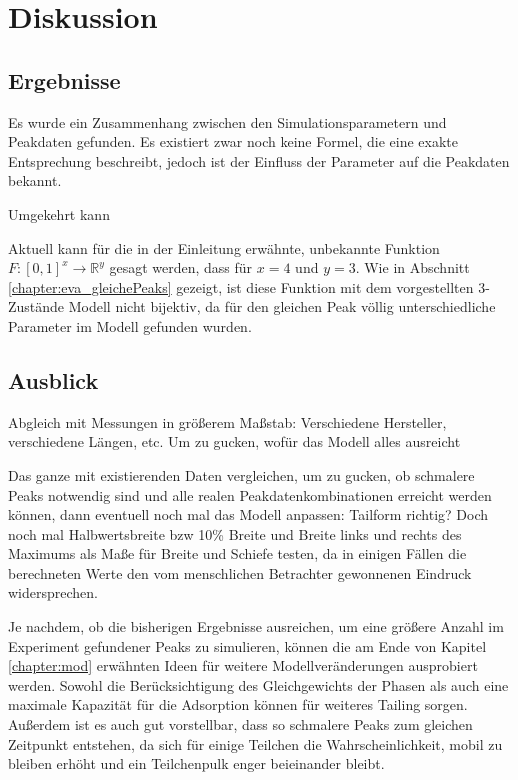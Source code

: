 \chapter{Diskussion}
\label{chapter:dis}

\section{Ergebnisse}
Es wurde ein Zusammenhang zwischen den Simulationsparametern und Peakdaten gefunden. Es existiert zwar noch keine Formel, die eine exakte Entsprechung beschreibt, jedoch ist der Einfluss der Parameter auf die Peakdaten bekannt. 

Umgekehrt kann 

Aktuell kann für die in der Einleitung erwähnte, unbekannte Funktion  $F: [0,1] ^ x \rightarrow \mathbb{R}^y$ gesagt werden, dass für $x = 4$ und $y = 3$. Wie in Abschnitt \ref{chapter:eva_gleichePeaks} gezeigt, ist diese Funktion mit dem vorgestellten 3-Zustände Modell nicht bijektiv, da für den gleichen Peak völlig unterschiedliche Parameter im Modell gefunden wurden.


\section{Ausblick}

Abgleich mit Messungen in größerem Maßstab: Verschiedene Hersteller, verschiedene Längen, etc. Um zu gucken, wofür das Modell alles ausreicht

Das ganze mit existierenden Daten vergleichen, um zu gucken, ob schmalere Peaks notwendig sind und alle realen Peakdatenkombinationen erreicht werden können, dann eventuell noch mal das Modell anpassen:
Tailform richtig?
Doch noch mal Halbwertsbreite bzw 10\% Breite und Breite links und rechts des Maximums als Maße für Breite und Schiefe testen, da in einigen Fällen die berechneten Werte den vom menschlichen Betrachter gewonnenen Eindruck widersprechen.


Je nachdem, ob die bisherigen Ergebnisse ausreichen, um eine größere Anzahl im Experiment gefundener Peaks zu simulieren, können die am Ende von Kapitel \ref{chapter:mod} erwähnten Ideen für weitere Modellveränderungen ausprobiert werden. Sowohl die Berücksichtigung des Gleichgewichts der Phasen als auch eine maximale Kapazität für die Adsorption können für weiteres Tailing sorgen. Außerdem ist es auch gut vorstellbar, dass so schmalere Peaks zum gleichen Zeitpunkt entstehen, da sich für einige Teilchen die Wahrscheinlichkeit, mobil zu bleiben erhöht und ein Teilchenpulk enger beieinander bleibt.

